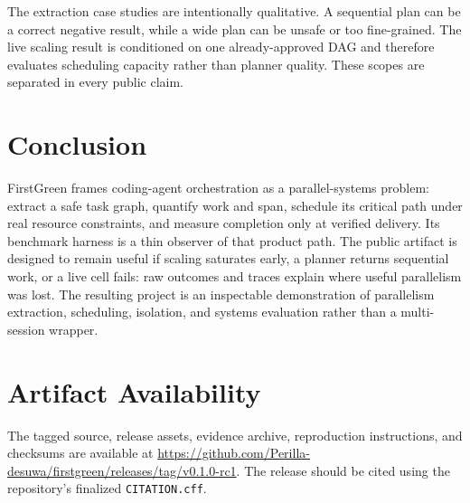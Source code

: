 \documentclass[10pt,twocolumn]{article}
\begin{document}
The extraction case studies are intentionally qualitative. A sequential plan can be a correct
negative result, while a wide plan can be unsafe or too fine-grained. The live scaling result is
conditioned on one already-approved DAG and therefore evaluates scheduling capacity rather than
planner quality. These scopes are separated in every public claim.

\section{Conclusion}

FirstGreen frames coding-agent orchestration as a parallel-systems problem: extract a safe task
graph, quantify work and span, schedule its critical path under real resource constraints, and
measure completion only at verified delivery. Its benchmark harness is a thin observer of that
product path. The public artifact is designed to remain useful if scaling saturates early, a planner
returns sequential work, or a live cell fails: raw outcomes and traces explain where useful
parallelism was lost. The resulting project is an inspectable demonstration of parallelism
extraction, scheduling, isolation, and systems evaluation rather than a multi-session wrapper.

\section*{Artifact Availability}

The tagged source, release assets, evidence archive, reproduction instructions, and checksums are
available at \url{https://github.com/Perilla-desuwa/firstgreen/releases/tag/v0.1.0-rc1}. The release
should be cited using the repository's finalized \texttt{CITATION.cff}.



\end{document}
